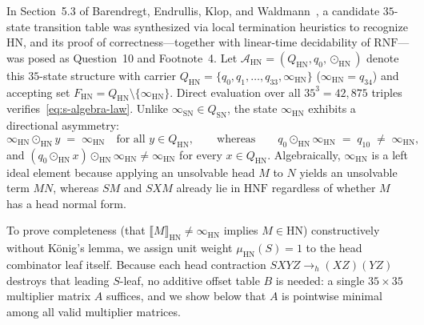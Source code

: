 \documentclass[11pt,reqno]{amsart}
\numberwithin{equation}{section}
\theoremstyle{plain}
\theoremstyle{definition}
\theoremstyle{remark}
\newcommand{\HNF}{\mathrm{HNF}}
\newcommand{\RNF}{\mathrm{RNF}}
\newcommand{\SN}{\mathrm{SN}}
\newcommand{\HN}{\mathrm{HN}}
\newcommand{\sem}[1]{\llbracket #1 \rrbracket}
\begin{document}
In Section~5.3 of Barendregt, Endrullis, Klop, and Waldmann~\cite[Figure~5.14, p.~85; Question~10 and Footnote~4, p.~86]{BarendregtEndrullisKlopWaldmann2017}, a candidate $35$-state transition table was synthesized via local termination heuristics to recognize $\HN$, and its proof of correctness---together with linear-time decidability of $\RNF$---was posed as Question~10 and Footnote~4. Let $\mathcal{A}_{\HN} = (Q_{\HN}, q_0, \odot_{\HN})$ denote this $35$-state structure with carrier $Q_{\HN} = \{q_0, q_1, \dots, q_{33}, \infty_{\HN}\}$ ($\infty_{\HN} = q_{34}$) and accepting set $F_{\HN} = Q_{\HN} \setminus \{\infty_{\HN}\}$. Direct evaluation over all $35^3 = 42{,}875$ triples verifies~\eqref{eq:s-algebra-law}. Unlike $\infty_{\SN} \in Q_{\SN}$, the state $\infty_{\HN}$ exhibits a directional asymmetry:
\begin{equation}\label{eq:hn-asymmetry}
\infty_{\HN} \odot_{\HN} y \;=\; \infty_{\HN} \quad\textrm{for all } y \in Q_{\HN},
\qquad\textrm{whereas}\qquad
q_0 \odot_{\HN} \infty_{\HN} \;=\; q_{10} \;\neq\; \infty_{\HN},
\end{equation}
and $(q_0 \odot_{\HN} x) \odot_{\HN} \infty_{\HN} \neq \infty_{\HN}$ for every $x \in Q_{\HN}$. Algebraically, $\infty_{\HN}$ is a left ideal element because applying an unsolvable head $M$ to $N$ yields an unsolvable term $M N$, whereas $S M$ and $S X M$ already lie in $\HNF$ regardless of whether $M$ has a head normal form.

To prove completeness (that $\sem{M}_{\HN} \neq \infty_{\HN}$ implies $M \in \HN$) constructively without K\"onig's lemma, we assign unit weight $\mu_{\HN}(S) = 1$ to the head combinator leaf itself. Because each head contraction $S X Y Z \to_h (X Z)(Y Z)$ destroys that leading $S$-leaf, no additive offset table $B$ is needed: a single $35 \times 35$ multiplier matrix $A$ suffices, and we show below that $A$ is pointwise minimal among all valid multiplier matrices.
\end{document}
